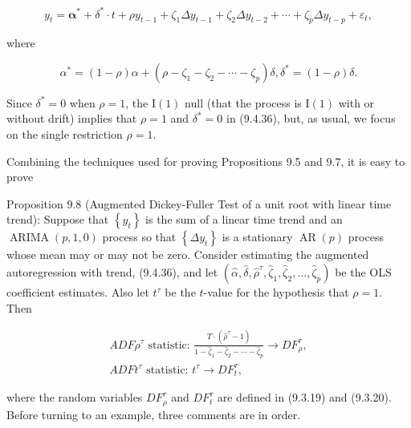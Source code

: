 \documentclass[10pt]{article}
\begin{document}
\begin{equation*}
y_{t}=\boldsymbol{\alpha}^{*}+\delta^{*} \cdot t+\rho y_{t-1}+\zeta_{1} \Delta y_{t-1}+\zeta_{2} \Delta y_{t-2}+\cdots+\zeta_{p} \Delta y_{t-p}+\varepsilon_{t}, \tag{9.4.36}
\end{equation*}


where


\begin{equation*}
\alpha^{*}=(1-\rho) \alpha+\left(\rho-\zeta_{1}-\zeta_{2}-\cdots-\zeta_{p}\right) \delta, \delta^{*}=(1-\rho) \delta . \tag{9.4.37}
\end{equation*}


Since $\delta^{*}=0$ when $\rho=1$, the $\mathrm{I}(1)$ null (that the process is $\mathrm{I}(1)$ with or without drift) implies that $\rho=1$ and $\delta^{*}=0$ in (9.4.36), but, as usual, we focus on the single restriction $\rho=1$.

Combining the techniques used for proving Propositions 9.5 and 9.7, it is easy to prove

Proposition 9.8 (Augmented Dickey-Fuller Test of a unit root with linear time trend): Suppose that $\left\{y_{t}\right\}$ is the sum of a linear time trend and an $\operatorname{ARIMA}(p, 1,0)$ process so that $\left\{\Delta y_{t}\right\}$ is a stationary $\operatorname{AR}(p)$ process whose mean may or may not be zero. Consider estimating the augmented autoregression with trend, (9.4.36), and let $\left(\hat{\alpha}, \hat{\delta}, \hat{\rho}^{\tau}, \hat{\zeta}_{1}, \hat{\zeta}_{2}, \ldots, \hat{\zeta}_{p}\right)$ be the OLS coefficient estimates. Also let $t^{\tau}$ be the $t$-value for the hypothesis that $\rho=1$. Then


\begin{gather*}
A D F \rho^{\tau} \text { statistic: } \frac{T \cdot\left(\hat{\rho}^{\tau}-1\right)}{1-\hat{\zeta}_{1}-\widehat{\zeta}_{2}-\cdots-\hat{\zeta}_{p}} \rightarrow D F_{\rho}^{\tau},  \tag{9.4.38}\\
A D F t^{\tau} \text { statistic: } t^{\tau} \rightarrow D F_{t}^{\tau}, \tag{9.4.39}
\end{gather*}


where the random variables $D F_{\rho}^{\tau}$ and $D F_{t}^{\tau}$ are defined in (9.3.19) and (9.3.20).\\
Before turning to an example, three comments are in order.
\end{document}

